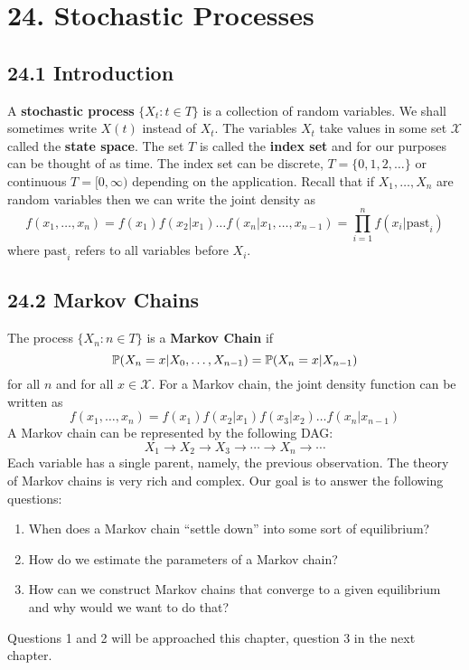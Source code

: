 \section*{24. Stochastic Processes}\label{stochastic-processes}

\subsection*{24.1 Introduction}\label{introduction:processes}
A \textbf{stochastic process} \(\{ X_t : t \in T \}\) is a collection of
random variables. We shall sometimes write \(X(t)\) instead of \(X_t\).
The variables \(X_t\) take values in some set \(\mathcal{X}\) called the
\textbf{state space}. The set \(T\) is called the \textbf{index set} and
for our purposes can be thought of as time. The index set can be
discrete, \(T = \{0, 1, 2, \dots \}\) or continuous \(T = [0, \infty)\)
depending on the application.
Recall that if \(X_{1}, \dots, X_{n}\) are random variables then we can
write the joint density as
\[
f(x_{1}, \dots, x_{n}) = f(x_{1}) f(x_{2} | x_{1}) \dots f(x_{n} | x_{1}, \dots, x_{n-1}) = \prod_{i=1}^{n} f(x_{i} | \text{past}_{i})
\]
where \(\text{past}_{i}\) refers to all variables before \(X_{i}\).

\subsection*{24.2 Markov Chains}\label{markov-chains}
The process \(\{ X_{n} : n \in T \}\) is a \textbf{Markov Chain} if
\[
\operatorname{\mathbb{P}}(X_{n} = x | X_{0}, \dots, X_{n-1}) = \operatorname{\mathbb{P}}(X_{n} = x | X_{n-1})
\]
for all \(n\) and for all \(x \in \mathcal{X}\).
For a Markov chain, the joint density function can be written as
\[
f(x_{1}, \dots, x_{n}) = f(x_{1}) f(x_{2} | x_{1}) f(x_{3} | x_{2}) \dots f(x_{n} | x_{n - 1})
\]
A Markov chain can be represented by the following DAG:
\[
X_{1} \longrightarrow X_{2} \longrightarrow X_{3} \longrightarrow \cdots \longrightarrow X_{n} \longrightarrow \cdots
\]
Each variable has a single parent, namely, the previous observation.
The theory of Markov chains is very rich and complex. Our goal is to
answer the following questions:
\begin{enumerate}
\def\labelenumi{\arabic{enumi}.}
\item
  When does a Markov chain ``settle down'' into some sort of
  equilibrium?
\item
  How do we estimate the parameters of a Markov chain?
\item
  How can we construct Markov chains that converge to a given
  equilibrium and why would we want to do that?
\end{enumerate}
Questions 1 and 2 will be approached this chapter, question 3 in the
next chapter.

